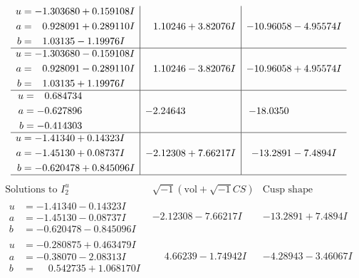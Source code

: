 \documentclass[1p]{elsarticle_modified}
\theoremstyle{definition}
\newcommand{\I}{\sqrt{-1}}
\begin{document}
$$\begin{array}{c|c|c}
\begin{aligned}
u &= -1.303680 + 0.159108 I \\
a &= \phantom{-}0.928091 + 0.289110 I \\
b &= \phantom{-}1.03135 - 1.19976 I\end{aligned}
 & \phantom{-}1.10246 + 3.82076 I & -10.96058 - 4.95574 I \\ \hline\begin{aligned}
u &= -1.303680 - 0.159108 I \\
a &= \phantom{-}0.928091 - 0.289110 I \\
b &= \phantom{-}1.03135 + 1.19976 I\end{aligned}
 & \phantom{-}1.10246 - 3.82076 I & -10.96058 + 4.95574 I \\ \hline\begin{aligned}
u &= \phantom{-}0.684734\phantom{ +0.000000I} \\
a &= -0.627896\phantom{ +0.000000I} \\
b &= -0.414303\phantom{ +0.000000I}\end{aligned}
 & -2.24643\phantom{ +0.000000I} & -18.0350\phantom{ +0.000000I} \\ \hline\begin{aligned}
u &= -1.41340 + 0.14323 I \\
a &= -1.45130 + 0.08737 I \\
b &= -0.620478 + 0.845096 I\end{aligned}
 & -2.12308 + 7.66217 I & -13.2891 - 7.4894 I\\
 \hline 
 \end{array}$$\newpage$$\begin{array}{c|c|c}  
\text{Solutions to }I^u_{2}& \I (\text{vol} + \sqrt{-1}CS) & \text{Cusp shape}\\
 \hline 
\begin{aligned}
u &= -1.41340 - 0.14323 I \\
a &= -1.45130 - 0.08737 I \\
b &= -0.620478 - 0.845096 I\end{aligned}
 & -2.12308 - 7.66217 I & -13.2891 + 7.4894 I \\ \hline\begin{aligned}
u &= -0.280875 + 0.463479 I \\
a &= -0.38070 - 2.08313 I \\
b &= \phantom{-}0.542735 + 1.068170 I\end{aligned}
 & \phantom{-}4.66239 - 1.74942 I & -4.28943 - 3.46067 I \\ \hline\begin{aligned}

\end{aligned}
\end{array}$$
\end{document}
